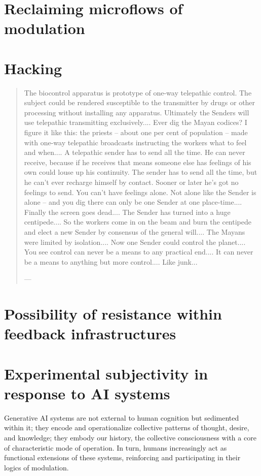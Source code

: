 \section{Reclaiming microflows of modulation}
\section{Hacking}

\begin{quote}
	The biocontrol apparatus is prototype of one-way telepathic control. The subject could be rendered susceptible to the transmitter by drugs or other processing without installing any apparatus. Ultimately the Senders will use telepathic transmitting exclusively.... Ever dig the Mayan codices? I figure it like this: the priests -- about one per cent of population -- made with one-way telepathic broadcasts instructing the workers what to feel and when.... A telepathic sender has to send all the time. He can never receive, because if he receives that means someone else has feelings of his own could louse up his continuity. The sender has to send all the time, but he can't ever recharge himself by contact. Sooner or later he's got no feelings to send. You can't have feelings alone. Not alone like the Sender is alone -- and you dig there can only be one Sender at one place-time.... Finally the screen goes dead.... The Sender has turned into a huge centipede.... So the workers come in on the beam and burn the centipede and elect a new Sender by consensus of the general will.... The Mayans were limited by isolation.... Now one Sender could control the planet.... You see control can never be a means to any practical end.... It can never be a means to anything but more control.... Like junk...

	— \cite[81]{burroughs1992}
\end{quote}



\section{Possibility of resistance within feedback infrastructures}
\section{Experimental subjectivity in response to AI systems}

Generative AI systems are not external to human cognition but sedimented within it; they encode and operationalize collective patterns of thought, desire, and knowledge; they embody our history, the collective consciousness with a core of characteristic mode of operation. In turn, humans increasingly act as functional extensions of these systems, reinforcing and participating in their logics of modulation.

